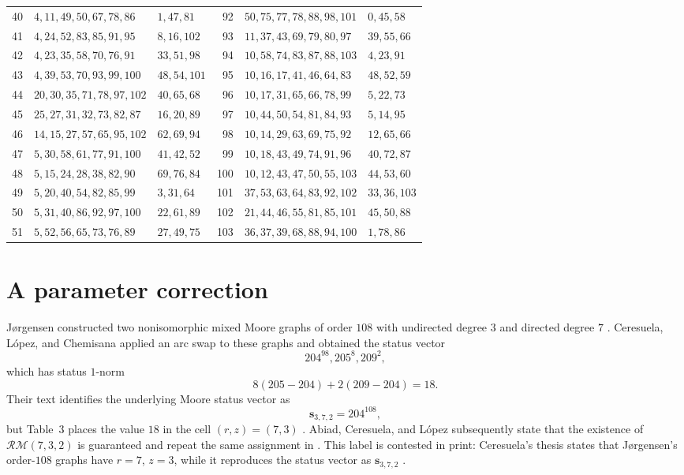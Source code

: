 \documentclass[11pt]{amsart}
\theoremstyle{remark}
\newcommand{\RM}{\mathcal{RM}}
\begin{document}
\begin{center}
\begin{tabular}{rll@{\quad}rll}
40 & $4,11,49,50,67,78,86$ & $1,47,81$ & 92 & $50,75,77,78,88,98,101$ & $0,45,58$ \\
41 & $4,24,52,83,85,91,95$ & $8,16,102$ & 93 & $11,37,43,69,79,80,97$ & $39,55,66$ \\
42 & $4,23,35,58,70,76,91$ & $33,51,98$ & 94 & $10,58,74,83,87,88,103$ & $4,23,91$ \\
43 & $4,39,53,70,93,99,100$ & $48,54,101$ & 95 & $10,16,17,41,46,64,83$ & $48,52,59$ \\
44 & $20,30,35,71,78,97,102$ & $40,65,68$ & 96 & $10,17,31,65,66,78,99$ & $5,22,73$ \\
45 & $25,27,31,32,73,82,87$ & $16,20,89$ & 97 & $10,44,50,54,81,84,93$ & $5,14,95$ \\
46 & $14,15,27,57,65,95,102$ & $62,69,94$ & 98 & $10,14,29,63,69,75,92$ & $12,65,66$ \\
47 & $5,30,58,61,77,91,100$ & $41,42,52$ & 99 & $10,18,43,49,74,91,96$ & $40,72,87$ \\
48 & $5,15,24,28,38,82,90$ & $69,76,84$ & 100 & $10,12,43,47,50,55,103$ & $44,53,60$ \\
49 & $5,20,40,54,82,85,99$ & $3,31,64$ & 101 & $37,53,63,64,83,92,102$ & $33,36,103$ \\
50 & $5,31,40,86,92,97,100$ & $22,61,89$ & 102 & $21,44,46,55,81,85,101$ & $45,50,88$ \\
51 & $5,52,56,65,73,76,89$ & $27,49,75$ & 103 & $36,37,39,68,88,94,100$ & $1,78,86$ \\
\bottomrule
\end{tabular}
\end{center}

\section{A parameter correction}

J{\o}rgensen constructed two nonisomorphic mixed Moore graphs of order
$108$ with undirected degree $3$ and directed degree $7$
\cite{Jorgensen2015}. Ceresuela, L\'opez,
and Chemisana applied an arc swap to these graphs and obtained the
status vector
\[
204^{98},205^8,209^2,
\]
which has status $1$-norm
\[
8(205-204)+2(209-204)=18.
\]
Their text identifies the underlying Moore status vector as
\[
\mathbf{s}_{3,7,2}=204^{108},
\]
but Table~3 places the value $18$ in the cell $(r,z)=(7,3)$
\cite[Table~3]{CLC2023}. Abiad, Ceresuela, and L\'opez
subsequently state that the existence of $\RM(7,3,2)$ is guaranteed
and repeat the same assignment in
\cite[p.~88 and Table~4.2]{ACL2026}. This label is contested in print:
Ceresuela's thesis states that J{\o}rgensen's order-$108$
graphs have $r=7$, $z=3$, while it reproduces the status
vector as $\mathbf{s}_{3,7,2}$ \cite{Ceresuela2024}.
\end{document}
